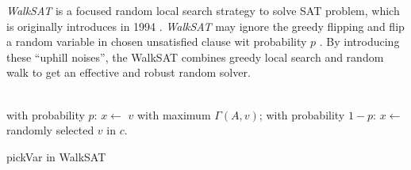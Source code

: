 \documentclass[12pt,a4paper,twoside]{scrartcl}
\numberwithin{equation}{section}
\begin{document}
\emph{WalkSAT} is a focused random local search strategy to solve SAT problem, which is originally introduces in 1994 \cite{hoos2002adaptive}.  \emph{WalkSAT} may ignore the greedy flipping and flip a random variable in chosen unsatisfied clause wit probability $p$ . By introducing these ``uphill noises'', the WalkSAT combines greedy local search and random walk to get an effective and robust random solver. \\
\\
\begin{algorithm}[H]
  with probability $p$: $x \leftarrow$   $v$ with maximum $\Gamma(A,v)$; \;
  with probability $1-p$:  $x \leftarrow$  randomly selected $v$ in $c$. 
 \caption{pickVar in WalkSAT}
\end{algorithm}  
\end{document}
